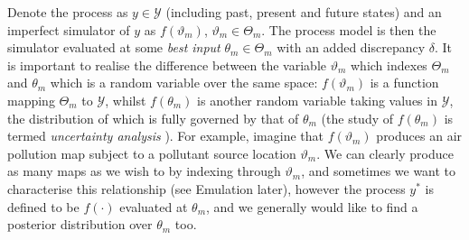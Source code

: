 \documentclass[10pt,a4paper]{article}
\begin{document}
Denote the process as  $y \in \mathcal{Y}$ (including past, present and future states) and an imperfect simulator of $y$ as $f(\vartheta_m)$, $\vartheta_m \in \Theta_m$. The process model is then the simulator evaluated at some \emph{best input} $\theta_m \in \Theta_m$ with an added discrepancy $\delta$. It is important to realise the difference between the variable $\vartheta_m$ which indexes $\Theta_m$ and $\theta_m$ which is a random variable over the same space: $f(\vartheta_m)$ is a function mapping $\Theta_m$ to $\mathcal{Y}$, whilst $f(\theta_m)$ is another random variable taking values in $\mathcal{Y}$, the distribution of which is fully governed by that of $\theta_m$ (the study of $f(\theta_m)$ is termed \emph{uncertainty analysis} \cite{OHagan_1998}). For example, imagine that $f(\vartheta_m)$ produces an air pollution map subject to a pollutant source location $\vartheta_m$. We can clearly produce as many maps as we wish to by indexing through $\vartheta_m$, and sometimes we want to characterise this relationship (see Emulation later), however the process $y^*$ is defined to be $f(\cdot)$ evaluated at $\theta_m$, and we generally would like to find a posterior distribution over $\theta_m$ too. 
\end{document}
